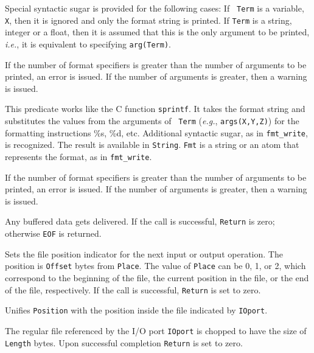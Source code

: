 \begin{description}
    Special syntactic sugar is provided for the following cases: If {\tt
      Term} is a variable, {\tt X}, then it is ignored and only the format
    string is printed. If {\tt Term} is a string, integer or a float, then
    it is assumed that this is the only argument to be printed, {\it i.e.},
    it is equivalent to specifying {\tt arg(Term)}.

    If the number of format specifiers is greater than the number of
    arguments to be printed, an error is issued. If the number of arguments
    is greater, then a warning is issued.

    This predicate works like the C function {\tt sprintf}. It takes the
    format string and substitutes the values from the arguments of {\tt
      Term} ({\it e.g.}, {\tt args(X,Y,Z)}) for the formatting instructions
    \%s, \%d, etc. Additional syntactic sugar, as in \verb|fmt_write|, is
    recognized. The result is available in {\tt String}. {\tt Fmt} is a
    string or an atom that represents the format, as in
    {\tt fmt\_write}.
    
    If the number of format specifiers is greater than the number of
    arguments to be printed, an error is issued. If the number of arguments
    is greater, then a warning is issued.

    Any buffered data gets delivered. If the call is successful, {\tt Return}
    is zero; otherwise {\tt EOF} is returned.

    Sets the file position indicator for the next input or output
    operation. The position is {\tt Offset} bytes from {\tt Place}.
    The value of {\tt Place} can be 0, 1, or 2, which correspond to
    the beginning of the file, the current position in the file, or
    the end of the file, respectively. If the call is successful,
    {\tt Return} is set to zero.

    Unifies {\tt Position} with the position inside the file indicated by
    {\tt IOport}.

    The regular file  referenced by the I/O port {\tt IOport}
    is chopped to have the size of {\tt Length} bytes. Upon successful
    completion {\tt Return} is set to zero.


\end{description}
